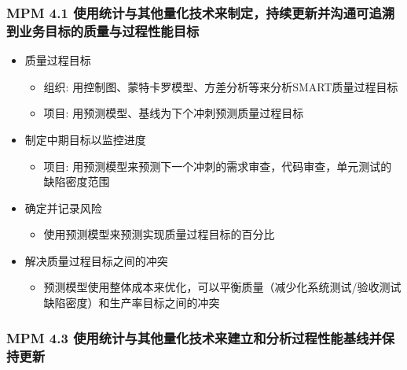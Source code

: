 \hypertarget{mpm-4.1-ux4f7fux7528ux7edfux8ba1ux4e0eux5176ux4ed6ux91cfux5316ux6280ux672fux6765ux5236ux5b9aux6301ux7eedux66f4ux65b0ux5e76ux6c9fux901aux53efux8ffdux6eafux5230ux4e1aux52a1ux76eeux6807ux7684ux8d28ux91cfux4e0eux8fc7ux7a0bux6027ux80fdux76eeux6807}{%
\subsubsection{MPM 4.1
使用统计与其他量化技术来制定，持续更新并沟通可追溯到业务目标的质量与过程性能目标}\label{mpm-4.1-ux4f7fux7528ux7edfux8ba1ux4e0eux5176ux4ed6ux91cfux5316ux6280ux672fux6765ux5236ux5b9aux6301ux7eedux66f4ux65b0ux5e76ux6c9fux901aux53efux8ffdux6eafux5230ux4e1aux52a1ux76eeux6807ux7684ux8d28ux91cfux4e0eux8fc7ux7a0bux6027ux80fdux76eeux6807}}

\begin{itemize}
\tightlist
\item
  质量过程目标

  \begin{itemize}
  \tightlist
  \item
    组织: 用控制图、蒙特卡罗模型、方差分析等来分析SMART质量过程目标
  \item
    项目: 用预测模型、基线为下个冲刺预测质量过程目标
  \end{itemize}
\item
  制定中期目标以监控进度

  \begin{itemize}
  \tightlist
  \item
    项目:
    用预测模型来预测下一个冲刺的需求审查，代码审查，单元测试的缺陷密度范围
  \end{itemize}
\item
  确定并记录风险

  \begin{itemize}
  \tightlist
  \item
    使用预测模型来预测实现质量过程目标的百分比
  \end{itemize}
\item
  解决质量过程目标之间的冲突

  \begin{itemize}
  \tightlist
  \item
    预测模型使用整体成本来优化，可以平衡质量（减少化系统测试/验收测试缺陷密度）和生产率目标之间的冲突
  \end{itemize}
\end{itemize}

\hypertarget{mpm-4.3-ux4f7fux7528ux7edfux8ba1ux4e0eux5176ux4ed6ux91cfux5316ux6280ux672fux6765ux5efaux7acbux548cux5206ux6790ux8fc7ux7a0bux6027ux80fdux57faux7ebfux5e76ux4fddux6301ux66f4ux65b0}{%
\subsubsection{MPM 4.3
使用统计与其他量化技术来建立和分析过程性能基线并保持更新}\label{mpm-4.3-ux4f7fux7528ux7edfux8ba1ux4e0eux5176ux4ed6ux91cfux5316ux6280ux672fux6765ux5efaux7acbux548cux5206ux6790ux8fc7ux7a0bux6027ux80fdux57faux7ebfux5e76ux4fddux6301ux66f4ux65b0}}

